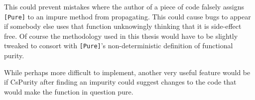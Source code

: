 \documentclass[a4paper,12pt]{article}
\begin{document}
This could prevent mistakes where the author of a piece of code falsely assigns \texttt{[Pure]} to an impure method from propagating. This could cause bugs to appear if somebody else uses that function unknowingly thinking that it is side-effect free. Of course the methodology used in this thesis would have to be slightly tweaked to consort with \texttt{[Pure]}'s non-deterministic definition of functional purity.

While perhaps more difficult to implement, another very useful feature would be if CsPurity after finding an impurity could suggest changes to the code that would make the function in question pure.





\end{document}
